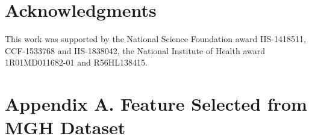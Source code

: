 \documentclass[pmlr]{jmlr}
\begin{document}
\section*{Acknowledgments}
This work was supported by the National Science Foundation award IIS-1418511, CCF-1533768 and IIS-1838042, the National Institute of Health award 1R01MD011682-01 and R56HL138415.


\newpage
\appendix

\section*{Appendix A. Feature Selected from MGH Dataset} 

\begin{table}[htb]
    \centering
{}
    \caption{96 selected rules out of 240 expert rules using MGH Dataset} \label{tab:features_mgh}
\end{table} 
\end{document}
